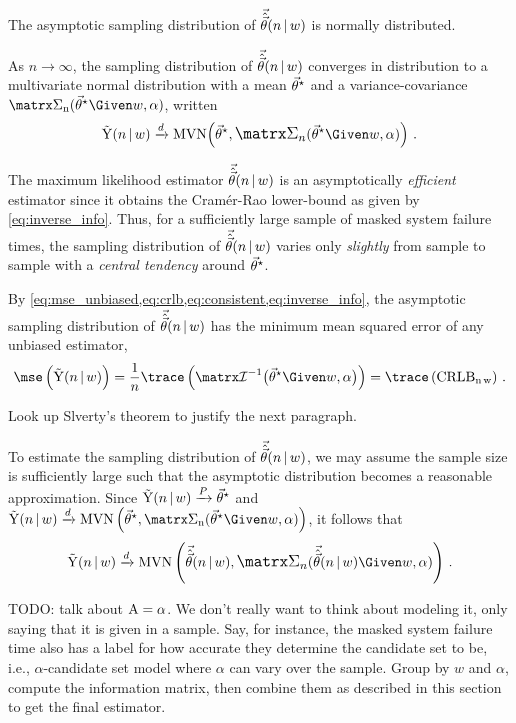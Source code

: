 \documentclass[ ../main.tex]{subfiles}
\begin{document}
The asymptotic sampling distribution of $\vec{\hat{\vec{\theta}}}(n {\,|\,} w)$ is normally distributed.
\begin{postulate}
\label{def:converge_in_dist}
    As $n \to \infty$, the sampling distribution of $\vec{\hat{\vec{\theta}}}(n {\,|\,} w)$ converges in distribution to a multivariate normal distribution with a mean ${\vec{\theta}}^{\star}$ and a variance-covariance $\cov(\tparam\sysparamvec \Given w, \alpha)$, written
    \begin{equation}
    \label{eq:converge_in_dist}
        \sampd \xrightarrow{d} \mvn\!
            \left(
                \tparam\sysparamvec, \cov(\tparam\sysparamvec \Given w, \alpha)
            \right)\,.
    \end{equation}
\end{postulate}
The maximum likelihood estimator $\vec{\hat{\vec{\theta}}}(n {\,|\,} w)$ is an asymptotically \emph{efficient} estimator since it obtains the Cram\'{e}r-Rao lower-bound as given by \cref{eq:inverse_info}. Thus, for a sufficiently large sample of masked system failure times, the sampling distribution of $\vec{\hat{\vec{\theta}}}(n {\,|\,} w)$ varies only \emph{slightly} from sample to sample with a \emph{central tendency} around ${\vec{\theta}}^{\star}$. 

By \cref{eq:mse_unbiased,eq:crlb,eq:consistent,eq:inverse_info}, the asymptotic sampling distribution of $\vec{\hat{\vec{\theta}}}(n {\,|\,} w)$ has the minimum mean squared error of any unbiased estimator,
\begin{equation}
\label{eq:mse_mle_trace}
\mse \left( \sampd \right) =
    \frac{1}{n} \trace \left (
        \infomatrx^{-1} \bigl(\tparam\sysparamvec \Given w, \alpha\bigr)
    \right) = \trace\left(\rm{CRLB}_{n\,w}\right)\,.
\end{equation}

\begin{remark}
Look up Slverty's theorem to justify the next paragraph.
\end{remark}
\sloppy
To estimate the sampling distribution of $\vec{\hat{\vec{\theta}}}(n {\,|\,} w)$, we may assume the sample size is sufficiently large such that the asymptotic distribution becomes a reasonable approximation. Since $\mathrm{\vec{Y}}(n {\,|\,} w) \xrightarrow{P} {\vec{\theta}}^{\star}$ and $\sampd \xrightarrow{d} \mvn\left(\tparam\sysparamvec, \cov(\tparam\sysparamvec \Given w, \alpha)\right)$, it follows that
\begin{equation}
\sampd \xrightarrow{d} \mvn\left(\mle, \cov(\mle \Given w, \alpha)\right)\,.
\end{equation}



TODO: talk about $\mathrm{A} = \alpha$. We don't really want to think about modeling it, only saying that it is given in a sample. Say, for instance, the masked system failure time also has a label for how accurate they determine the candidate set to be, i.e., $\alpha$-candidate set model where $\alpha$ can vary over the sample. Group by $w$ and $\alpha$, compute the information matrix, then combine them as described in this section to get the final estimator.
\end{document}
